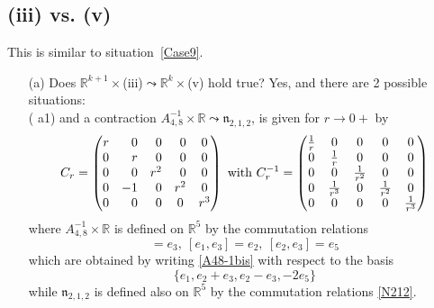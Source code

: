 \documentclass[
reqno]{amsart}
\begin{document}
\subsection{(iii) vs. (v)}\label{Case10} 
This is similar to situation~\ref{Case9}. 
\begin{itemize}
\item[(a)] Does ${{\mathbb R}}^{k+1}\times$(iii)${\leadsto}$${{\mathbb R}}^k\times$(v) hold true?   
Yes, and there are 2 possible situations: 
\\ ({{\bfseries\itshape} a1})  
and a contraction $A_{4,8}^{-1}\times{{\mathbb R}}{\leadsto} {{\mathfrak n}}_{2,1,2}$, 
is given for $r\to 0+$ by 
$$C_r
=\begin{pmatrix}
\hfill r & \hfill 0           & \hfill 0           & \hfill 0   & 0              \\
\hfill 0 & \hfill r           & \hfill 0           & \hfill 0   & 0              \\
\hfill 0 & \hfill 0           & \hfill r^2         & \hfill 0   & 0              \\
\hfill 0 &       -1           & \hfill 0           & \hfill r^2 & 0              \\
       0 & \hfill 0           & \hfill 0           &  0         & r^3  
\end{pmatrix}
\text{ with }
C_r^{-1}=
\begin{pmatrix}
 \frac{1}{r}  &  0             & 0             & 0             & 0    \\
 0            &  \frac{1}{r}   & 0             & 0             & 0    \\
 0            &  0             & \frac{1}{r^2} & 0             & 0    \\
 0            &  \frac{1}{r^3} & 0             & \frac{1}{r^2} & 0    \\
 0            &  0             & 0             & 0             & \frac{1}{r^3}   
 \end{pmatrix}
$$
where $A_{4,8}^{-1}\times{{\mathbb R}}$ is defined on ${{\mathbb R}}^5$ by the commutation relations 
\begin{equation*}
[e_1,e_2]=e_3,\ [e_1,e_3]=e_2,\ [e_2,e_3]=e_5 
\end{equation*}
which are obtained by writing \eqref{A48-1bis} 
with respect to the basis 
$$\{e_1,e_2+e_3,e_2-e_3,-2e_5\}$$ 
while ${{\mathfrak n}}_{2,1,2}$ is defined also on ${{\mathbb R}}^5$ 
by the commutation relations \eqref{N212}. 
$$
\end{itemize}
\end{document}
